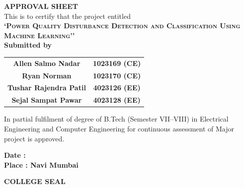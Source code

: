 \documentclass[12pt,a4paper]{report}
\begin{document}
\setcounter{page}{1}

\begin{center}
\vspace*{0.2cm}
{\LARGE\bf APPROVAL SHEET} \\[0.45cm]

{\large This is to certify that the project entitled}\\[0.25cm]

{\Large\bf \textsc{`Power Quality Disturbance Detection and Classification Using Machine Learning''}}\\[0.35cm]

{\large\bf Submitted by}\\[0.3cm]

\begin{tabular}{cc}
\large\textbf{Allen Salmo Nadar} & \large\textbf{1023169 (CE)} \\
\large\textbf{Ryan Norman} & \large\textbf{1023170 (CE)} \\
\large\textbf{Tushar Rajendra Patil} & \large\textbf{4023126 (EE)} \\
\large\textbf{Sejal Sampat Pawar} & \large\textbf{4023128 (EE)}
\end{tabular}

\vspace{0.45cm}

{\large
In partial fulfilment of degree of B.Tech (Semester VII--VIII) in Electrical Engineering and Computer Engineering for continuous assessment of Major project is approved.
\par
}

\vspace{0.65cm}


\begin{flushleft}
\textbf{Date : }\\[0.15cm]
\textbf{Place : Navi Mumbai} 
\end{flushleft}

\vspace{-0.2cm}
\textbf{COLLEGE SEAL}

\end{center}
\clearpage
\end{document}
